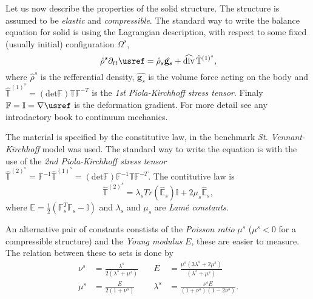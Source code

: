 Let us now describe the properties of the solid structure. The structure is assumed to be 
\emph{elastic} and \emph{compressible}. The standard way to write the balance equation for solid is
using the Lagrangian description, with respect to some fixed (usually initial) configuration 
$\Omega^s$,
\begin{equation}
  \hat{\rho}^s \partial_{tt} \usref = \hat{\rho}_s\hat{\mathbf{g}_s} 
  + \widehat{\mathrm{div}}\,\hat{\mathbb{T}}^{{(1)}^s},
\end{equation}
where $\hat{\rho}^s$ is the refferential density, $\hat{\mathbf{g}_s}$ is the volume force
acting on the body and 
$\hat{\mathbb{T}}^{{(1)}^s} = (\mathrm{det} \mathbb{F})\mathbb{T}\mathbb{F}^{-T}$
is the \emph{1st Piola-Kirchhoff stress tensor}. Finaly $\mathbb{F} = \mathbb{I} = \nabla \usref$
is the deformation gradient. For more detail see any introdactory book to continuum mechanics.

The material is specified by the constitutive law, in the benchmark 
\emph{St. Vennant-Kirchhoff} model was used. The standard way to write the equation is with 
the use of the \emph{2nd Piola-Kirchhoff stress tensor} 
$\hat{\mathbb{T}}^{{(2)}^s} = \mathbb{F}^{-1}\hat{\mathbb{T}}^{{(1)}^s}
 = (\mathrm{det} \mathbb{F})\mathbb{F}^{-1}\mathbb{T}\mathbb{F}^{-T}$.
The contitutive law is
\begin{equation}
  \hat{\mathbb{T}}^{{(2)}^s} = \lambda_s Tr(\hat{\mathbb{E}}_s)\mathbb{I} + 2 \mu_s\hat{\mathbb{E}}_s,
\end{equation}
where $\mathbb{E} = \frac{1}{2} \left( \mathbb{F}_s^T\mathbb{F}_s - \mathbb{I} \right)$
and $\lambda_s$ and $\mu_s$ are \emph{Lamé constants}.

An alternative pair of constants constists of the \emph{Poisson ratio} $\mu^s$ 
($\mu^s < 0 $ for a compressible structure) and the \emph{Young modulus} $E$, these are
easier to measure. The relation between these to sets is done by
\begin{align}
  \nu^s &= \frac{\lambda^s}{2(\lambda^s + \mu^s)} \quad
  &E &= \frac{\mu^s(3\lambda^s + 2\mu^s)}{(\lambda^s + \mu^s)} \\
  \mu^s &= \frac{E}{2(1+\nu^s)} \quad
  &\lambda^s &= \frac{\nu^sE}{(1+\nu^s)(1-2\nu^s)}.
\end{align}


